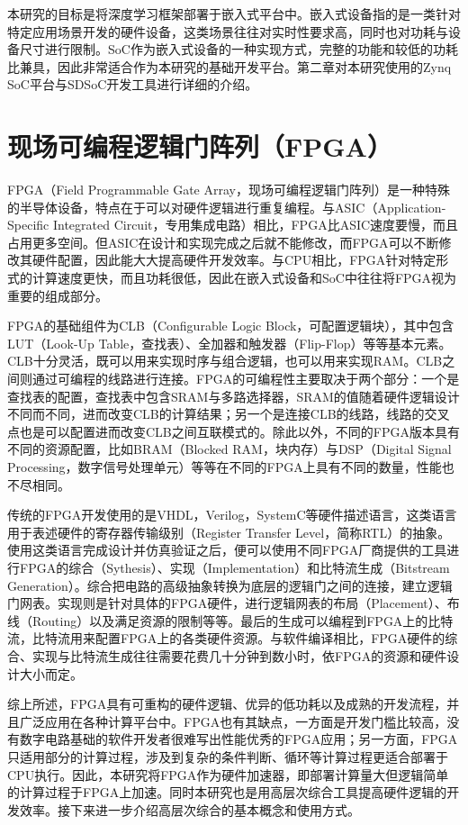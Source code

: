 本研究的目标是将深度学习框架部署于嵌入式平台中。嵌入式设备指的是一类针对特定应用场景开发的硬件设备，这类场景往往对实时性要求高，同时也对功耗与设备尺寸进行限制。SoC作为嵌入式设备的一种实现方式，完整的功能和较低的功耗比兼具，因此非常适合作为本研究的基础开发平台。第二章对本研究使用的Zynq SoC平台与SDSoC开发工具进行详细的介绍。

\section{现场可编程逻辑门阵列（FPGA）}

FPGA（Field Programmable Gate Array，现场可编程逻辑门阵列）是一种特殊的半导体设备，特点在于可以对硬件逻辑进行重复编程。与ASIC（Application-Specific Integrated Circuit，专用集成电路）相比，FPGA比ASIC速度要慢，而且占用更多空间。但ASIC在设计和实现完成之后就不能修改，而FPGA可以不断修改其硬件配置，因此能大大提高硬件开发效率。与CPU相比，FPGA针对特定形式的计算速度更快，而且功耗很低，因此在嵌入式设备和SoC中往往将FPGA视为重要的组成部分。

FPGA的基础组件为CLB（Configurable Logic Block，可配置逻辑块），其中包含LUT（Look-Up Table，查找表）、全加器和触发器（Flip-Flop）等等基本元素。CLB十分灵活，既可以用来实现时序与组合逻辑，也可以用来实现RAM。CLB之间则通过可编程的线路进行连接。FPGA的可编程性主要取决于两个部分：一个是查找表的配置，查找表中包含SRAM与多路选择器，SRAM的值随着硬件逻辑设计不同而不同，进而改变CLB的计算结果；另一个是连接CLB的线路，线路的交叉点也是可以配置进而改变CLB之间互联模式的。除此以外，不同的FPGA版本具有不同的资源配置，比如BRAM（Blocked RAM，块内存）与DSP（Digital Signal Processing，数字信号处理单元）等等在不同的FPGA上具有不同的数量，性能也不尽相同。

传统的FPGA开发使用的是VHDL，Verilog，SystemC等硬件描述语言，这类语言用于表述硬件的寄存器传输级别（Register Transfer Level，简称RTL）的抽象。使用这类语言完成设计并仿真验证之后，便可以使用不同FPGA厂商提供的工具进行FPGA的综合（Sythesis）、实现（Implementation）和比特流生成（Bitstream Generation）。综合把电路的高级抽象转换为底层的逻辑门之间的连接，建立逻辑门网表。实现则是针对具体的FPGA硬件，进行逻辑网表的布局（Placement）、布线（Routing）以及满足资源的限制等等。最后的生成可以编程到FPGA上的比特流，比特流用来配置FPGA上的各类硬件资源。与软件编译相比，FPGA硬件的综合、实现与比特流生成往往需要花费几十分钟到数小时，依FPGA的资源和硬件设计大小而定。

综上所述，FPGA具有可重构的硬件逻辑、优异的低功耗以及成熟的开发流程，并且广泛应用在各种计算平台中。FPGA也有其缺点，一方面是开发门槛比较高，没有数字电路基础的软件开发者很难写出性能优秀的FPGA应用；另一方面，FPGA只适用部分的计算过程，涉及到复杂的条件判断、循环等计算过程更适合部署于CPU执行。因此，本研究将FPGA作为硬件加速器，即部署计算量大但逻辑简单的计算过程于FPGA上加速。同时本研究也是用高层次综合工具提高硬件逻辑的开发效率。接下来进一步介绍高层次综合的基本概念和使用方式。


